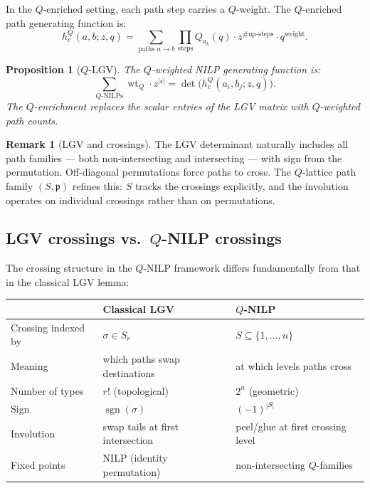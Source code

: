 \documentclass[11pt]{article}
\DeclareMathOperator{\wt}{wt}
\DeclareMathOperator{\sgn}{sgn}
\theoremstyle{plain}
\newtheorem{proposition}[theorem]{Proposition}
\theoremstyle{definition}
\newtheorem{remark}[theorem]{Remark}
\begin{document}
In the $Q$-enriched setting, each path step carries a
$Q$-weight.  The $Q$-enriched path generating function is:
\begin{equation}\label{eq:Q-path-gf}
  h_c^Q(a, b; z, q)
  = \sum_{\text{paths } a \to b}
    \prod_{\text{steps}} Q_{a_k}(q) \cdot
    z^{\#\text{up-steps}} \cdot q^{\text{weight}}.
\end{equation}

\begin{proposition}[$Q$-LGV]
\label{prop:Q-LGV}
The $Q$-weighted NILP generating function is:
\begin{equation}\label{eq:Q-LGV}
  \sum_{\text{$Q$-NILPs}}
    \wt_Q \cdot z^{|\mathfrak{c}|}
  = \det\bigl(h_c^Q(a_i, b_j; z, q)\bigr).
\end{equation}
The $Q$-enrichment replaces the scalar entries of the LGV
matrix with $Q$-weighted path counts.
\end{proposition}

\begin{remark}[LGV and crossings]
\label{rem:LGV-crossings}
The LGV determinant naturally includes all path
families --- both non-intersecting and intersecting ---
with sign from the permutation.  Off-diagonal permutations
force paths to cross.  The $Q$-lattice path family
$(S, \mathfrak{p})$ refines this: $S$ tracks the
crossings explicitly, and the involution operates on
individual crossings rather than on permutations.
\end{remark}


\subsection{LGV crossings vs.\ $Q$-NILP crossings}
\label{sec:LGV-vs-QNILP}

The crossing structure in the $Q$-NILP framework differs
fundamentally from that in the classical LGV lemma:

\begin{center}
\begin{tabular}{l|l|l}
  & \textbf{Classical LGV} & \textbf{$Q$-NILP} \\ \hline
Crossing indexed by &
  $\sigma \in S_r$ &
  $S \subseteq \{1, \ldots, n\}$ \\
Meaning &
  which paths swap destinations &
  at which levels paths cross \\
Number of types &
  $r!$ (topological) &
  $2^n$ (geometric) \\
Sign &
  $\sgn(\sigma)$ &
  $(-1)^{|S|}$ \\
Involution &
  swap tails at first intersection &
  peel/glue at first crossing level \\
Fixed points &
  NILP (identity permutation) &
  non-intersecting $Q$-families \\
\end{tabular}
\end{center}
\end{document}
